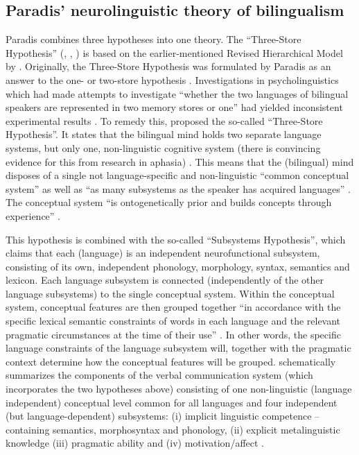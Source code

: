\subsection{Paradis’ neurolinguistic theory of bilingualism}
\label{sec:5.3.1}  
Paradis combines three hypotheses into one theory. The “Three-Store Hypothesis” (\citeyear{paradis_bilingual_1978; paradis_language_1980}, \citeyear[195--203]{paradis_neurolinguistic_2004}, \citeyear[3--28]{kecskes_neurofunctional_2007}) is based on the earlier-mentioned Revised Hierarchical Model by \citet{kroll_category_1994}. Originally, the Three-Store Hypothesis was formulated by Paradis as an answer to the one- or two-store hypothesis \citep{kolers_bilingualism_1968,hornby_bilingual_1977}. Investigations in psycholinguistics which had made attempts to investigate “whether the two languages of bilingual speakers are represented in two memory stores or one” had yielded inconsistent experimental results \citep[6]{kecskes_neurofunctional_2007}. To remedy this, \citet{paradis_bilingual_1978, paradis_language_1980} proposed the so-called “Three-Store Hypothesis”. It states that the bilingual mind holds two separate language systems, but only one, non-linguistic cognitive system (there is convincing evidence for this from research in aphasia) \citep[196]{paradis_neurolinguistic_2004}. This means that the (bilingual) mind disposes of a single not language-specific and non-linguistic “common conceptual system” as well as “as many subsystems as the speaker has acquired languages” \citep[3]{kecskes_neurofunctional_2007}. The conceptual system “is ontogenetically prior and builds concepts through experience” \citep[198]{paradis_neurolinguistic_2004}.

This hypothesis is combined with the so-called “Subsystems Hypothesis”, which claims that each (language) is an independent neurofunctional subsystem, consisting of its own, independent phonology, morphology, syntax, semantics and lexicon. Each language subsystem is connected (independently of the other language subsystems) to the single conceptual system. Within the conceptual system, conceptual features are then grouped together “in accordance with the specific lexical semantic constraints of words in each language and the relevant pragmatic circumstances at the time of their use” \citep[3]{kecskes_neurofunctional_2007}. In other words, the specific language constraints of the language subsystem will, together with the pragmatic context determine how the conceptual features will be grouped.  schematically summarizes the components of the verbal communication system (which incorporates the two hypotheses above) consisting of one non-linguistic (language independent) conceptual level common for all languages and four independent (but language-dependent) subsystems: (i) implicit linguistic competence – containing semantics, morphosyntax and phonology, (ii) explicit metalinguistic knowledge (iii) pragmatic ability and (iv) motivation\slash affect \citep[3]{paradis_neurolinguistic_2004, kecskes_neurofunctional_2007}.

